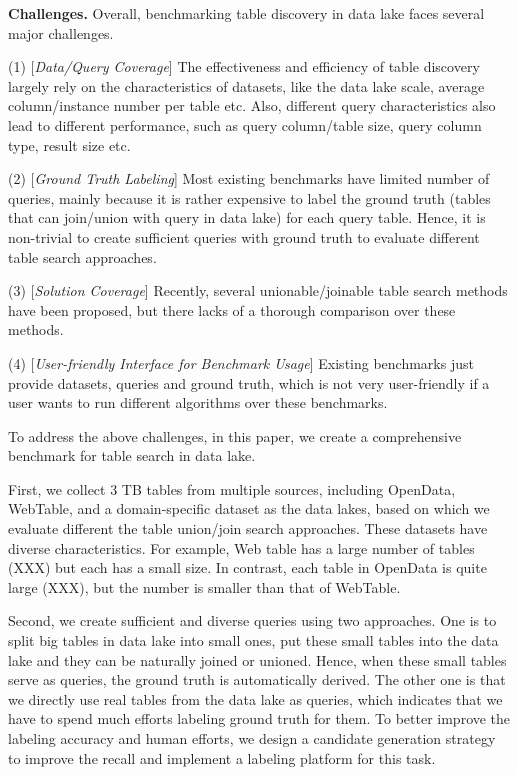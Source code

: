 \noindent \textbf{Challenges.} Overall, benchmarking table discovery in data lake faces several major challenges.

\noindent (1) [\textit{Data/Query Coverage}] The effectiveness and efficiency of table discovery largely rely on the characteristics of datasets, like the data lake scale, average column/instance number per table etc. Also, different query  characteristics also lead to different performance, such as query column/table size,  query column type,  result size etc. 

\noindent (2) [\textit{Ground Truth Labeling}] 
 Most existing benchmarks have limited number of queries,  mainly because it is rather expensive to label the ground truth (tables  that can join/union with query in data lake) for each query table. Hence, it is non-trivial to create sufficient queries with ground truth to evaluate different table search approaches.

\noindent (3) [\textit{Solution Coverage}] 
Recently, several unionable/joinable table search methods have been proposed, but there lacks of a thorough comparison over these methods.

\noindent (4) [\textit{User-friendly Interface for Benchmark Usage}] Existing benchmarks just provide datasets, queries and ground truth, which is not very user-friendly if a user wants to
run different algorithms over these benchmarks.


To address the above challenges, in this paper, we create a comprehensive benchmark \sys for table search in data lake.

 First, we collect 3 TB tables from multiple sources, including OpenData, WebTable, and a domain-specific dataset as the data lakes, based on which we evaluate different the table union/join search approaches. These datasets have diverse characteristics. For example, Web table has a large number of tables (XXX) but each has a small size. In contrast, each table in OpenData is quite large (XXX), but the number is smaller than that of WebTable. 
 
 
Second, we create sufficient and diverse queries using two approaches. 
One is to split big tables in data lake into small ones, put these small tables into the data lake and they can be naturally joined or unioned. Hence, when these small tables serve as queries, the ground truth is automatically derived. 
The other one is that we directly use real tables from the data lake as queries, which indicates that we have to spend much efforts labeling ground truth for them.
To better improve the labeling accuracy and human efforts, we design a candidate generation strategy to improve the recall and implement a labeling platform for this task.   

